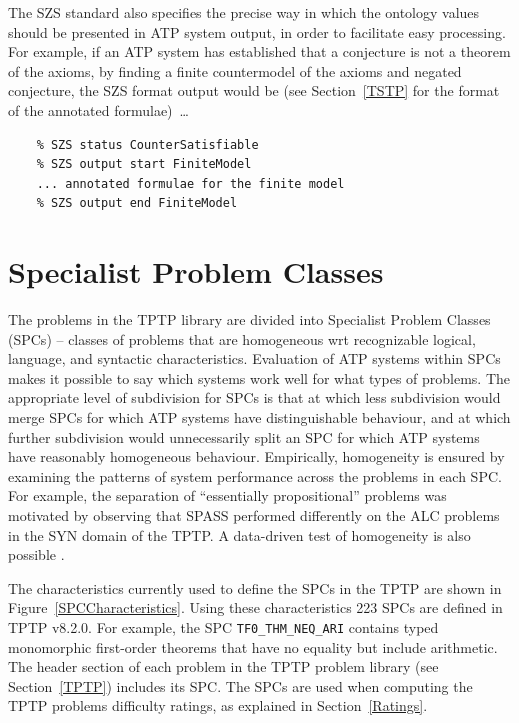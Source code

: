 \documentclass{easychair}
\begin{document}
The SZS standard also specifies the precise way in which the ontology values should be presented
in ATP system output, in order to facilitate easy processing.
For example, if an ATP system has established that a conjecture is not a theorem of the axioms,
by finding a finite countermodel of the axioms and negated conjecture, the SZS format output 
would be (see Section~\ref{TSTP} for the format of the annotated formulae)~\ldots \\
\begin{minipage}{\textwidth}
\begin{verbatim}
    % SZS status CounterSatisfiable
    % SZS output start FiniteModel
    ... annotated formulae for the finite model 
    % SZS output end FiniteModel
\end{verbatim}
\end{minipage}

\vspace*{1em}

\section{Specialist Problem Classes}
\label{SPCs}

The problems in the TPTP library are divided into Specialist Problem Classes (SPCs) -- classes of 
problems that are homogeneous wrt recognizable logical, language, and syntactic characteristics.
Evaluation of ATP systems within SPCs makes it possible to say which systems work well for what 
types of problems. 
The appropriate level of subdivision for SPCs is that at which less subdivision would merge 
SPCs for which ATP systems have distinguishable behaviour, and at which further subdivision
would unnecessarily split an SPC for which ATP systems have reasonably homogeneous behaviour.
Empirically, homogeneity is ensured by examining the patterns of system performance across the 
problems in each SPC. 
For example, the separation of ``essentially propositional'' problems was motivated by observing 
that SPASS \cite{WA+99} performed differently on the ALC problems in the SYN domain of the TPTP.
A data-driven test of homogeneity is also possible \cite{FS02}.

The characteristics currently used to define the SPCs in the TPTP are shown in 
Figure~\ref{SPCCharacteristics}.
Using these characteristics 223 SPCs are defined in TPTP v8.2.0. 
For example, the SPC
{\tt TF0\_THM\_NEQ\_ARI} contains typed monomorphic first-order theorems that have no equality but 
include arithmetic.
The header section of each problem in the TPTP problem library (see Section~\ref{TPTP}) includes 
its SPC.
The SPCs are used when computing the TPTP problems difficulty ratings, as explained in
Section~\ref{Ratings}.
\end{document}
